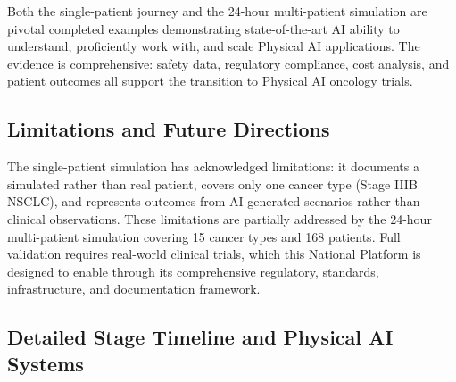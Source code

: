 Both the single-patient journey and the 24-hour multi-patient simulation are
pivotal completed examples demonstrating state-of-the-art AI ability to
understand, proficiently work with, and scale Physical AI applications. The
evidence is comprehensive: safety data, regulatory compliance, cost analysis,
and patient outcomes all support the transition to Physical AI oncology trials.

\subsection{Limitations and Future Directions}
\label{subsec:journey-limitations}

The single-patient simulation has acknowledged limitations: it documents a
simulated rather than real patient, covers only one cancer type (Stage IIIB
NSCLC), and represents outcomes from AI-generated scenarios rather than
clinical observations. These limitations are partially addressed by the
24-hour multi-patient simulation covering 15 cancer types and 168 patients.
Full validation requires real-world clinical trials, which this National
Platform is designed to enable through its comprehensive regulatory, standards,
infrastructure, and documentation framework.

\subsection{Detailed Stage Timeline and Physical AI Systems}
\label{subsec:journey-detailed-timeline}

